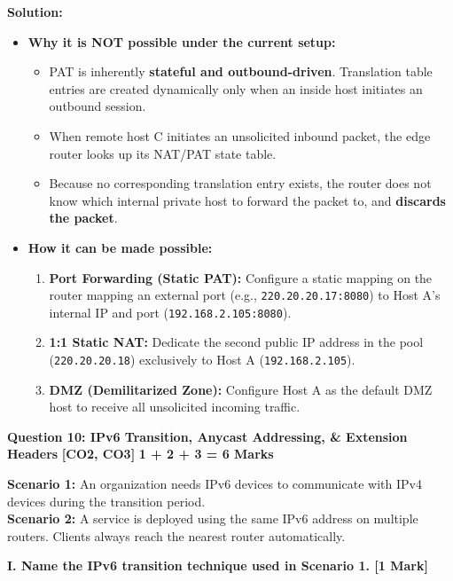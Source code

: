 \documentclass[11pt,a4paper]{article}
\newcommand{\questionheader}[3]{
    \vspace{0.35cm}
    \noindent\colorbox{qboxbg}{
        \parbox{\dimexpr\textwidth-2\fboxsep\relax}{
            \textbf{\textcolor{primary}{\large #1}} \hfill \textbf{\textcolor{accent}{[#2]}} \hfill \textbf{\textcolor{secondary}{#3 Marks}}
        }
    }
    \vspace{0.15cm}
}
\begin{document}
\textbf{Solution:}
\begin{itemize}
    \item \textbf{Why it is NOT possible under the current setup:}
    \begin{itemize}
        \item PAT is inherently \textbf{stateful and outbound-driven}. Translation table entries are created dynamically only when an inside host initiates an outbound session.
        \item When remote host C initiates an unsolicited inbound packet, the edge router looks up its NAT/PAT state table.
        \item Because no corresponding translation entry exists, the router does not know which internal private host to forward the packet to, and \textbf{discards the packet}.
    \end{itemize}
    \item \textbf{How it can be made possible:}
    \begin{enumerate}
        \item \textbf{Port Forwarding (Static PAT):} Configure a static mapping on the router mapping an external port (e.g., \texttt{220.20.20.17:8080}) to Host A's internal IP and port (\texttt{192.168.2.105:8080}).
        \item \textbf{1:1 Static NAT:} Dedicate the second public IP address in the pool (\texttt{220.20.20.18}) exclusively to Host A (\texttt{192.168.2.105}).
        \item \textbf{DMZ (Demilitarized Zone):} Configure Host A as the default DMZ host to receive all unsolicited incoming traffic.
    \end{enumerate}
\end{itemize}

\questionheader{Question 10: IPv6 Transition, Anycast Addressing, \& Extension Headers}{CO2, CO3}{1 + 2 + 3 = 6}

\textbf{Scenario 1:} An organization needs IPv6 devices to communicate with IPv4 devices during the transition period.\\
\textbf{Scenario 2:} A service is deployed using the same IPv6 address on multiple routers. Clients always reach the nearest router automatically.

\textbf{I. Name the IPv6 transition technique used in Scenario 1. [1 Mark]}
\end{document}
